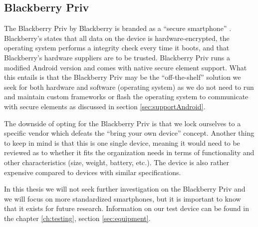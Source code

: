 \subsection{Blackberry Priv}
\label{sec:blackberry}
The Blackberry Priv by Blackberry is branded as a ``secure smartphone'' \cite{blackberryPriv}. Blackberry's states that all data on the device is hardware-encrypted, the operating system performs a integrity check every time it boots, and that Blackberry's hardware suppliers are to be trusted. Blackberry Priv runs a modified Android version and comes with native secure element support. What this entails is that the Blackberry Priv may be the ``off-the-shelf'' solution we seek for both hardware and software (operating system) as we do not need to run and maintain custom frameworks or flash the operating system to communicate with secure elements as discussed in section \ref{sec:supportAndroid}.

The downside of opting for the Blackberry Priv is that we lock ourselves to a specific vendor which defeats the ``bring your own device'' concept. Another thing to keep in mind is that this is one single device, meaning it would need to be reviewed as to whether it fits the organization needs in terms of functionality and other characteristics (size, weight, battery, etc.). The device is also rather expensive compared to devices with similar specifications.

In this thesis we will not seek further investigation on the Blackberry Priv and we will focus on more standardized smartphones, but it is important to know that it exists for future research. Information on our test device can be found in the chapter \ref{ch:testing}, section \ref{sec:equipment}.




